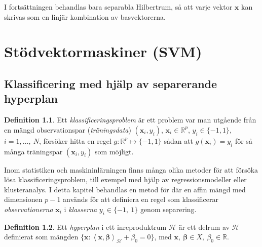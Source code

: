 \documentclass[a4paper, 12pt]{report}
\theoremstyle{definition}
\newtheorem{defi}{Definition}[section]
\theoremstyle{remark}
\newcommand{\bfbeta}{{\boldsymbol{\beta}}}
\newcommand{\bfx}{\mathbf{x}}
\newcommand{\llangle}{\left\langle}
\newcommand{\rrangle}{\right\rangle}
\newcommand{\inner}[2]{\llangle #1, #2 \rrangle}
\newcommand{\hil}{\mathcal{H}}
\begin{document}
I fortsättningen behandlas bara separabla Hilbertrum, så att varje vektor $\mathbf{x}$ kan skrivas som en linjär kombination av basvektorerna.

\chapter{Stödvektormaskiner (SVM)}

\section{Klassificering med hjälp av separerande hyperplan}

\begin{defi}
	Ett \textit{klassificeringsproblem} är ett problem var man utgående från en mängd observationspar (\textit{träningsdata}) $\left(\mathbf{x}_i,y_i\right)$, $\mathbf{x}_i\in\mathbb{R}^p$, $y_i\in \{-1,1\}$, $i=1,\dots,~N$, försöker hitta en regel $g: \mathbb{R}^p \longmapsto \{-1,1\}$ sådan att $g\left(\mathbf{x}_i\right)=y_i$ för så många träningspar $\left(\mathbf{x}_i,y_i\right)$ som möjligt.
\end{defi}

Inom statistiken och maskininlärningen finns många olika metoder för att försöka lösa klassificeringsproblem, till exempel med hjälp av regressionsmodeller eller klusteranalys. I detta kapitel behandlas en metod för där en affin mängd med dimensionen $p-1$ används för att definiera en regel som klassificerar \textit{observationerna} $\mathbf{x}_i$ i \textit{klasserna} $y_i\in\{-1,~1\}$ genom separering.

\begin{defi}
	Ett \textit{hyperplan} i ett inreproduktrum $\mathcal{H}$ är ett delrum av $\mathcal{H}$ definierat som mängden $\{\mathbf{x}: \inner{\bfx}{\bfbeta}_\mathcal{H} + \beta_0=0\}$, med $\mathbf{x},~\bfbeta\in X,~\beta_0\in\mathbb{R}$.
\end{defi}
\end{document}
